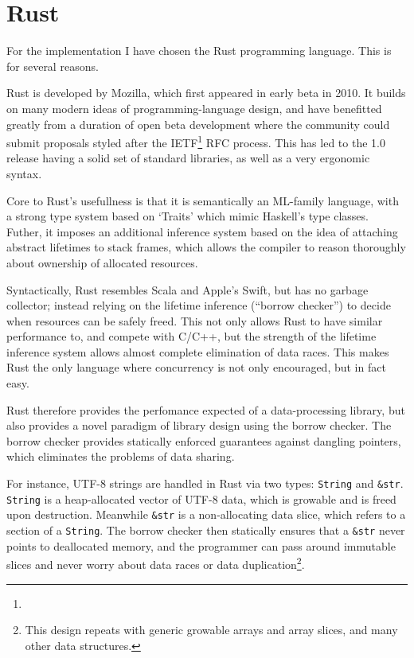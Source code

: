 \documentclass{DIKU-report-variant}
\begin{document}
\section{Rust}

For the implementation I have chosen the Rust programming language. This
is for several reasons.

Rust is developed by Mozilla, which first appeared in early beta in 2010. It
builds on many modern ideas of programming-language design, and have benefitted
greatly from a duration of open beta development where the community could submit
proposals styled after the IETF\footnote{%
} RFC process. This has led to the 1.0 release having a solid set of standard libraries,
as well as a very ergonomic syntax.

Core to Rust's usefullness is that it is semantically an ML-family language, with a strong type
system based on `Traits' which mimic Haskell's type classes. Futher, it imposes an additional
inference system based on the idea of attaching abstract lifetimes to stack frames, which allows
the compiler to reason thoroughly about ownership of allocated resources.

Syntactically, Rust resembles Scala and Apple's Swift, but has no garbage collector; instead relying
on the lifetime inference (``borrow checker'') to decide when resources can be safely freed. This not
only allows Rust to have similar performance to, and compete with C/C++, but the strength of the lifetime
inference system allows almost complete elimination of data races. This makes Rust the only language
where concurrency is not only encouraged, but in fact easy.

Rust therefore provides the perfomance expected of a data-processing library, but also
provides a novel paradigm of library design using the borrow checker. The borrow checker provides
statically enforced guarantees against dangling pointers, which eliminates the problems
of data sharing.

For instance, UTF-8 strings are handled in Rust via two types: \texttt{String} and \texttt{\&str}.
\texttt{String} is a heap-allocated vector of UTF-8 data, which is growable and is freed upon destruction.
Meanwhile \texttt{\&str} is a non-allocating data slice, which refers to a section of a \texttt{String}.
The borrow checker then statically ensures that a \texttt{\&str} never points to deallocated memory, and
the programmer can pass around immutable slices and never worry about data races or data duplication\footnote{
This design repeats with generic growable arrays and array slices, and many other data structures.}.
\end{document}
